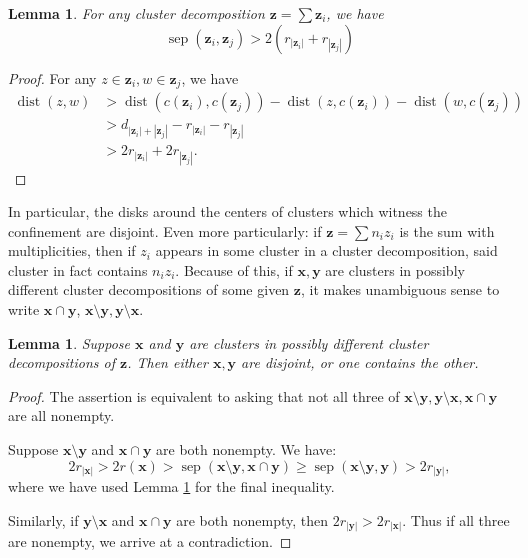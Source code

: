 \documentclass{article}
\def\C{\mathbb{C}}
\DeclareMathOperator{\dist}{dist}
\DeclareMathOperator{\sep}{sep}
\def\bz{\mathbf{z}} %
\newtheorem{lemma}[theorem]{Lemma}
\theoremstyle{definition}
\begin{document}
\begin{lemma} \label{lem: cluster distance bound}
    For any cluster decomposition $\mathbf{z} = \sum \mathbf{z}_i$, we have
    $$ \sep(\bz_i,\bz_j) > 2 (r_{|\mathbf{z}_i|} +  r_{|\mathbf{z}_j|}) $$
\end{lemma}
\begin{proof}
For any $z \in \mathbf{z}_i, w \in \mathbf{z}_j$, we have
\begin{align*}
    \dist(z,w) & > \dist(c(\mathbf{z}_i),  c(\mathbf{z}_j)) - \dist(z, c(\mathbf{z}_i)) - \dist( w, c(\mathbf{z}_j)) \\
    & >  d_{|\mathbf{z}_i|+|\mathbf{z}_j|} - r_{|\mathbf{z}_i|} - r_{|\mathbf{z}_j|} \\ &
    > 2 r_{|\mathbf{z}_i|} + 2 r_{|\mathbf{z}_j|}.
\end{align*}
\end{proof}
In particular, the disks around the centers of clusters which witness the confinement are disjoint.  Even more particularly: if $\mathbf{z}= \sum n_i z_i$ is the sum with multiplicities, then if $z_i$ appears in some cluster in a cluster decomposition, said cluster in fact contains $n_i z_i$.   Because of this, if $\mathbf{x}, \mathbf{y}$ are clusters in possibly different cluster decompositions of some given $\mathbf{z}$, it makes unambiguous sense to write $\mathbf{x} \cap \mathbf{y}$, $\mathbf{x} \setminus \mathbf{y}, \mathbf{y} \setminus \mathbf{x}$. 

\begin{lemma} \label{comparing cluster decompositions}
    Suppose $\mathbf{x}$ and $\mathbf{y}$ are clusters in possibly different cluster decompositions of $\mathbf{z}$.  Then either $\mathbf{x}, \mathbf{y}$ are disjoint, or one contains the other. 
\end{lemma}
\begin{proof}
The assertion is equivalent to asking that not all three of $\mathbf{x} \setminus \mathbf{y}, \mathbf{y} \setminus \mathbf{x}, \mathbf{x} \cap \mathbf{y}$ are all nonempty. 

Suppose $\mathbf{x} \setminus \mathbf{y}$ and $\mathbf{x} \cap \mathbf{y}$ are both nonempty.  We have: 
$$ 2 r_{|\mathbf{x}|} > 2 r(\mathbf{x}) > \sep(\mathbf{x} \setminus \mathbf{y}, \mathbf{x} \cap \mathbf{y}) \geq \sep(\mathbf{x} \setminus \mathbf{y}, \mathbf{y}) > 2r_{|\mathbf{y}|},$$
where we have used  Lemma \ref{lem: cluster distance bound} for the final inequality.

Similarly, if $\mathbf{y} \setminus \mathbf{x}$ and $\mathbf{x} \cap \mathbf{y}$ are both nonempty, then $2r_{|\mathbf{y}|} > 2 r_{|\mathbf{x}|}$. 
Thus if all three are nonempty, we arrive at a contradiction. 
\end{proof}
\end{document}
